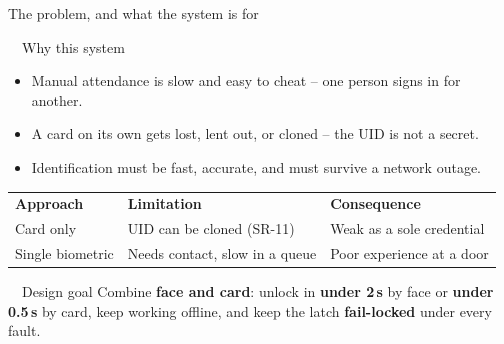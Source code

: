 \documentclass[aspectratio=169, 10pt]{beamer}
\newcommand{\thead}[1]{\textcolor{MLIOTwhite}{\textbf{\footnotesize #1}}}
\begin{document}
\begin{frame}{The problem, and what the system is for}
  \vspace{-0.1em}
  \begin{card}{\faExclamationTriangle~~Why this system}
    \scriptsize
    \begin{itemize}
      \item Manual attendance is slow and easy to cheat -- one person signs in for another.
      \item A card on its own gets lost, lent out, or cloned -- the UID is not a secret.
      \item Identification must be fast, accurate, and must survive a network outage.
    \end{itemize}
  \end{card}
  \vspace{0.3em}
  \centering
  \renewcommand{\arraystretch}{1.2}
  \scriptsize
  \begin{tabular}{@{}p{3.3cm}p{4.4cm}p{3.6cm}@{}}
    \rowcolor{MLIOTnavy}\thead{Approach} & \thead{Limitation} & \thead{Consequence} \\
    Card only & UID can be cloned (SR-11) & Weak as a sole credential \\
    \rowcolor{MLIOTbglight} Single biometric & Needs contact, slow in a queue & Poor experience at a door \\
  \end{tabular}
  \vspace{0.4em}
  \begin{goldcard}[width=0.92\textwidth]{\faBullseye~~Design goal}
    \scriptsize Combine \textbf{face and card}: unlock in \textbf{under 2\,s} by face or \textbf{under 0.5\,s} by card, keep working offline, and keep the latch \textbf{fail-locked} under every fault.
  \end{goldcard}
\end{frame}
\end{document}

